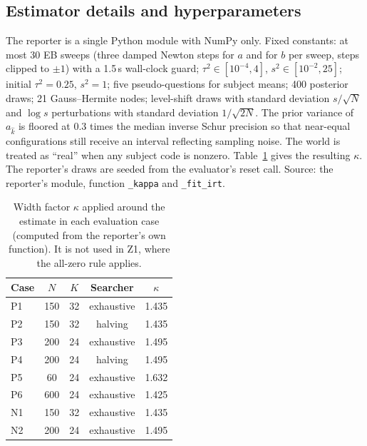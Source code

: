 \documentclass{article}
\begin{document}
\subsection{Estimator details and hyperparameters}
The reporter is a single Python module with NumPy only. Fixed constants: at most 30 EB sweeps (three damped Newton steps for $a$ and for $b$ per sweep, steps clipped to $\pm1$) with a 1.5\,s wall-clock guard; $\tau^2\in[10^{-4},4]$, $s^2\in[10^{-2},25]$; initial $\tau^2=0.25$, $s^2=1$; five pseudo-questions for subject means; 400 posterior draws; 21 Gauss--Hermite nodes; level-shift draws with standard deviation $s/\sqrt N$ and $\log s$ perturbations with standard deviation $1/\sqrt{2N}$. The prior variance of $a_{\hat k}$ is floored at $0.3$ times the median inverse Schur precision so that near-equal configurations still receive an interval reflecting sampling noise. The world is treated as ``real'' when any subject code is nonzero. Table~\ref{tab:kappa} gives the resulting $\kappa$. The reporter's draws are seeded from the evaluator's reset call. Source: the reporter's module, function \texttt{\_kappa} and \texttt{\_fit\_irt}.

\begin{table}[h]
\centering
\caption{Width factor $\kappa$ applied around the estimate in each evaluation case (computed from the reporter's own function). It is not used in Z1, where the all-zero rule applies.}
\label{tab:kappa}
\small
\begin{tabular}{lcccc}
\toprule
Case & $N$ & $K$ & Searcher & $\kappa$ \\
\midrule
P1 & 150 & 32 & exhaustive & 1.435 \\
P2 & 150 & 32 & halving & 1.435 \\
P3 & 200 & 24 & exhaustive & 1.495 \\
P4 & 200 & 24 & halving & 1.495 \\
P5 & 60 & 24 & exhaustive & 1.632 \\
P6 & 600 & 24 & exhaustive & 1.425 \\
N1 & 150 & 32 & exhaustive & 1.435 \\
N2 & 200 & 24 & exhaustive & 1.495 \\
\bottomrule
\end{tabular}
\end{table}
\end{document}

